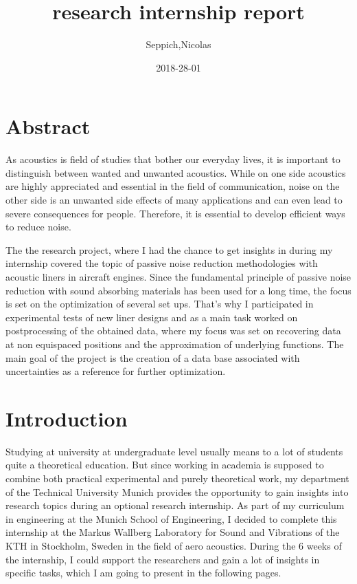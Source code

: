 \documentclass{article}
\title{research internship report}
\date{2018-28-01}
\author{Seppich,Nicolas}
\begin{document}
\maketitle
{}
\newpage
{}

\setcounter{secnumdepth}{5}

\section{Abstract}
As acoustics is field of studies that bother our everyday lives, it is important to distinguish between wanted and unwanted acoustics.
While on one side acoustics are highly appreciated and essential in the field of communication, noise on the other side is an unwanted side effects of many applications and can even lead to severe consequences for people.
Therefore, it is essential to develop efficient ways to reduce noise.

The the research project, where I had the chance to get insights in during my internship covered the topic of passive noise reduction methodologies with acoustic liners in aircraft engines.
Since the fundamental principle of passive noise reduction with sound absorbing materials has been used for a long time, the focus is set on the optimization of several set ups.
That’s why I participated in experimental tests of new liner designs and as a main task worked on postprocessing of the obtained data, where my focus was set on recovering data at non equispaced positions and the approximation of underlying functions.
The main goal of the project is the creation of a data base associated with uncertainties as a reference for further optimization.  

\newpage 

\section{Introduction} 
Studying at university at undergraduate level usually means to a lot of students quite a theoretical education.
But since working in academia is supposed to combine both practical experimental and purely theoretical work, my department of the Technical University Munich provides the opportunity to gain insights into research topics during an optional research internship.
As part of my curriculum in engineering at the Munich School of Engineering, I decided to complete this internship at the Markus Wallberg Laboratory for Sound and Vibrations of the KTH in Stockholm, Sweden in the field of aero acoustics.
During the 6 weeks of the internship, I could support the researchers and gain a lot of insights in specific tasks, which I am going to present in the following pages.  
\end{document}

